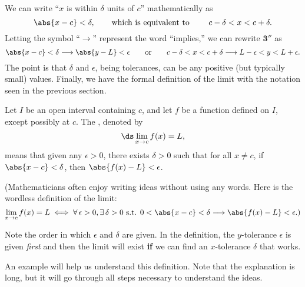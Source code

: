 We can write ``$x$ is within $\delta$ units of $c$'' mathematically as
$$\abs{x-c} < \delta, \qquad \text{which is equivalent to }\qquad c-\delta < x < c+\delta.$$
Letting the symbol ``$\longrightarrow$'' represent the word ``implies,'' we can rewrite $\textbf{3}''$ as 
$$
\abs{x - c} < \delta \longrightarrow  \abs{y - L} < \epsilon 
\qquad \textrm{or} \qquad c - \delta < x < c + \delta \longrightarrow L - \epsilon < y < L + \epsilon.
$$
The point is that $\delta$ and $\epsilon$, being tolerances, can be any positive (but typically small) values.  Finally, we have the formal definition of the limit with the notation  seen in the previous section.

{Let $I$ be an open interval containing $c$, and let $f$ be a function defined on $I$, except possibly at $c$. The , denoted by
\[\ds\lim_{x\rightarrow c} f(x) = L,\]
means that given any $\epsilon > 0$, there exists $\delta > 0$ such that for all $x\neq c$,  
if  $\abs{x - c} < \delta$, then $\abs{f(x) - L} < \epsilon$.
}

(Mathematicians often enjoy writing ideas without using any words. Here is the wordless definition of the limit:
\[
\lim_{x\to c} f(x) = L \iff
\forall \, \epsilon > 0, \exists \, \delta > 0 \text{ s.t. }
0<\abs{x - c} < \delta \longrightarrow \abs{f(x) - L} < \epsilon\text{.)}
\]

Note the order in which $\epsilon$ and $\delta$ are given.  In the definition, the $y$-tolerance $\epsilon$ is given \textit{first} and then the limit will exist \textbf{if} we can find an $x$-tolerance $\delta$ that works.


An example will help us understand this definition.  Note that the explanation is long, but it will go through all steps necessary to understand the ideas.

